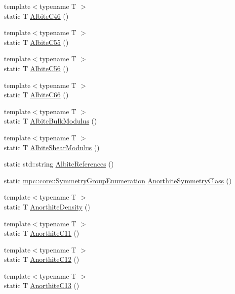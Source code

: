 \begin{DoxyCompactItemize}
\item 
{\footnotesize template$<$typename T $>$ }\\static T \mbox{\hyperlink{namespacempc_1_1data_ac964881e8421c24e60848c477b1a6377}{Albite\+C46}} ()
\item 
{\footnotesize template$<$typename T $>$ }\\static T \mbox{\hyperlink{namespacempc_1_1data_ab06bb611e69a79e1030e7d74dd9ccf7a}{Albite\+C55}} ()
\item 
{\footnotesize template$<$typename T $>$ }\\static T \mbox{\hyperlink{namespacempc_1_1data_aa82672ed487ef6ead61b471a7988de05}{Albite\+C56}} ()
\item 
{\footnotesize template$<$typename T $>$ }\\static T \mbox{\hyperlink{namespacempc_1_1data_a54c4461c6a3bc9d625f49bf1d03fe78d}{Albite\+C66}} ()
\item 
{\footnotesize template$<$typename T $>$ }\\static T \mbox{\hyperlink{namespacempc_1_1data_a5ebb9d2c3decc84c941dd1f713fb077d}{Albite\+Bulk\+Modulus}} ()
\item 
{\footnotesize template$<$typename T $>$ }\\static T \mbox{\hyperlink{namespacempc_1_1data_afaaeae63580831419afe4a20b13b35cf}{Albite\+Shear\+Modulus}} ()
\item 
static std\+::string \mbox{\hyperlink{namespacempc_1_1data_afa959db50e7cfd9c57b14f7ab5b58888}{Albite\+References}} ()
\item 
static \mbox{\hyperlink{namespacempc_1_1core_a9d979684062547055a0ef5c13077bad8}{mpc\+::core\+::\+Symmetry\+Group\+Enumeration}} \mbox{\hyperlink{namespacempc_1_1data_af03565960ef339f19d236479a871e4a5}{Anorthite\+Symmetry\+Class}} ()
\item 
{\footnotesize template$<$typename T $>$ }\\static T \mbox{\hyperlink{namespacempc_1_1data_a9e8d5f9dcc2e5f3bb0a82fd7d66d33dd}{Anorthite\+Density}} ()
\item 
{\footnotesize template$<$typename T $>$ }\\static T \mbox{\hyperlink{namespacempc_1_1data_aae7d252fc61b5c0b052096739c3a6e42}{Anorthite\+C11}} ()
\item 
{\footnotesize template$<$typename T $>$ }\\static T \mbox{\hyperlink{namespacempc_1_1data_aee9fe50a9ff9cb28ca9ee38d306e1cf9}{Anorthite\+C12}} ()
\item 
{\footnotesize template$<$typename T $>$ }\\static T \mbox{\hyperlink{namespacempc_1_1data_a18a0c72b244e7853bc1f73c9dbf8a776}{Anorthite\+C13}} ()

\end{DoxyCompactItemize}
